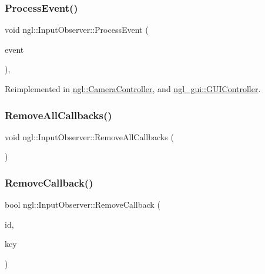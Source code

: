 \mbox{\label{classngl_1_1_input_observer_a10b36e303875ce065b3091a8fd805da1}} 
\subsubsection{\texorpdfstring{Process\+Event()}{ProcessEvent()}}
{\footnotesize\ttfamily void ngl\+::\+Input\+Observer\+::\+Process\+Event (\begin{DoxyParamCaption}\item[{const \mbox{\hyperlink{structngl_1_1_input_event}{Input\+Event}} \&}]{event }\end{DoxyParamCaption})\hspace{0.3cm}{\ttfamily [protected]}, {\ttfamily [virtual]}}



Reimplemented in \mbox{\hyperlink{classngl_1_1_camera_controller_ab7dc975eba1a28e8ade7da84ba0ddc86}{ngl\+::\+Camera\+Controller}}, and \mbox{\hyperlink{classngl__gui_1_1_g_u_i_controller_aadbc0790314a254e62a78524bca5e482}{ngl\+\_\+gui\+::\+G\+U\+I\+Controller}}.

\mbox{\label{classngl_1_1_input_observer_af8452d08dab25ef2cb042165769fcc34}} 
\subsubsection{\texorpdfstring{Remove\+All\+Callbacks()}{RemoveAllCallbacks()}}
{\footnotesize\ttfamily void ngl\+::\+Input\+Observer\+::\+Remove\+All\+Callbacks (\begin{DoxyParamCaption}{ }\end{DoxyParamCaption})}

\mbox{\label{classngl_1_1_input_observer_a8b5d0b434a01c53f460a81f87537e943}} 
\subsubsection{\texorpdfstring{Remove\+Callback()}{RemoveCallback()}}
{\footnotesize\ttfamily bool ngl\+::\+Input\+Observer\+::\+Remove\+Callback (\begin{DoxyParamCaption}\item[{const std\+::string \&}]{id,  }\item[{\mbox{\hyperlink{namespacengl_a5b20ff50635da5e3adb6bec00c062497}{Event\+Key\+\_\+T}}}]{key }\end{DoxyParamCaption})}

